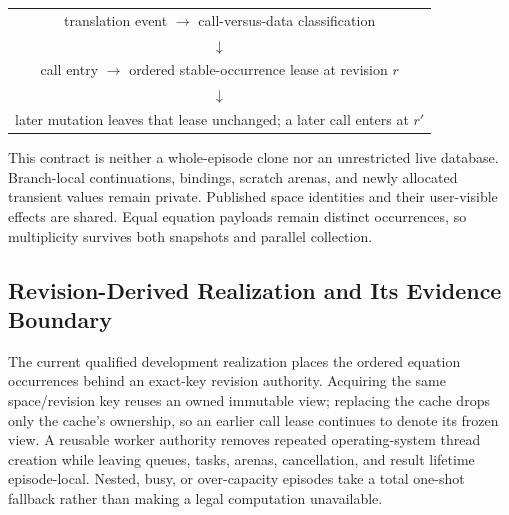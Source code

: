\documentclass[11pt]{article}
\begin{document}
\begin{center}
\begin{tabular}{c}
translation event $\longrightarrow$ call-versus-data classification \\
$\downarrow$ \\
call entry $\longrightarrow$ ordered stable-occurrence lease at revision $r$ \\
$\downarrow$ \\
later mutation leaves that lease unchanged; a later call enters at $r'$
\end{tabular}
\end{center}

This contract is neither a whole-episode clone nor an unrestricted live
database.  Branch-local continuations, bindings, scratch arenas, and newly
allocated transient values remain private.  Published space identities and
their user-visible effects are shared.  Equal equation payloads remain
distinct occurrences, so multiplicity survives both snapshots and parallel
collection.

\subsection{Revision-Derived Realization and Its Evidence Boundary}

The current qualified development realization places the ordered equation
occurrences behind an exact-key revision authority.  Acquiring the same
space/revision key reuses an owned immutable view; replacing the cache drops
only the cache's ownership, so an earlier call lease continues to denote its
frozen view.  A reusable worker authority removes repeated operating-system
thread creation while leaving queues, tasks, arenas, cancellation, and result
lifetime episode-local.  Nested, busy, or over-capacity episodes take a total
one-shot fallback rather than making a legal computation unavailable.
\end{document}
